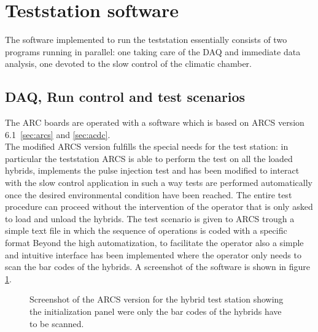 \section{Teststation software}

The software implemented to run the teststation essentially consists of two programs running in parallel: one taking care of the DAQ and immediate data analysis, one devoted to the slow control of the climatic chamber. 

\subsection{DAQ, Run control and test scenarios}

The ARC boards are operated with a software which is based on ARCS version 6.1~\ref{sec:arcs} and \ref{sec:acdc}.\\
The modified ARCS version fulfills the special needs for the test station: in particular the teststation ARCS is able to perform the test on all the loaded hybrids, implements the pulse injection test and 
has been modified to interact with the slow control application in such a way tests are performed automatically once the desired environmental condition have been reached. The entire test procedure can proceed without the intervention of the operator that is only asked to load and unload the hybrids. The test scenario is given to ARCS trough a simple text file in which the sequence of operations is coded with a specific format
Beyond the high automatization, to facilitate the operator also a simple and intuitive interface has been implemented where the operator only needs to scan the bar codes of the hybrids. A screenshot of the software is shown in figure \ref{fig:ss_arcs_teststation}.
\begin{figure}[h]
  \begin{center}
    \caption{Screenshot of the ARCS version for the hybrid test station showing the initialization panel were only the bar codes of the hybrids have to be scanned.}
    \label{fig:ss_arcs_teststation}
  \end{center}
\end{figure}

